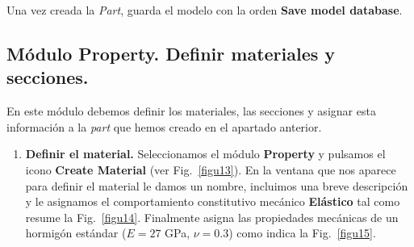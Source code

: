 Una vez creada la \textit{Part}, guarda el modelo con la orden
\textbf{Save model database}.
\newpage

\subsection{Módulo Property. Definir materiales y secciones.}

En este módulo debemos definir los materiales, las secciones y asignar
esta información a la \textit{part} que hemos creado en el apartado
anterior.
\begin{enumerate}
\item \textbf{Definir el material.} Seleccionamos el módulo
  \textbf{Property} y pulsamos el icono \textbf{Create Material} (ver
  Fig.~\ref{figu13}). En la ventana que nos aparece para definir el
  material le damos un nombre, incluimos una breve descripción y le
  asignamos el comportamiento constitutivo mecánico \textbf{Elástico}
  tal como resume la Fig.~\ref{figu14}. Finalmente asigna las
  propiedades mecánicas de un hormigón estándar ($E=27$ GPa,
  $\nu=0.3$) como indica la Fig.~\ref{figu15}.


\end{enumerate}
